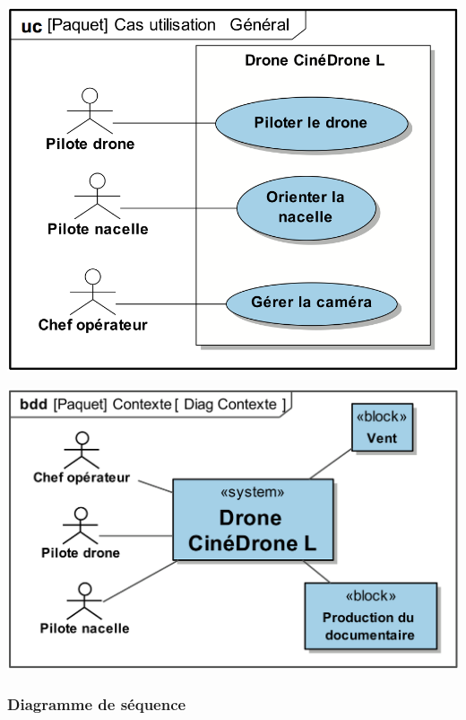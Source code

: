 \documentclass[11pt,oneside]{article}
\begin{document}
\begin{exemple}

\begin{minipage}[c]{.45\linewidth}
\begin{center}
\includegraphics[width=.8\textwidth]{png/PNG/SysML_Drone_Uc}
\end{center}
\end{minipage} \hfill
\begin{minipage}[c]{.45\linewidth}
\begin{center}
\includegraphics[width=.8\textwidth]{png/PNG/SysML_Drone_Contexte}
\end{center}
\end{minipage}

\end{exemple}


\subsubsection{Diagramme de séquence}
\end{document}
